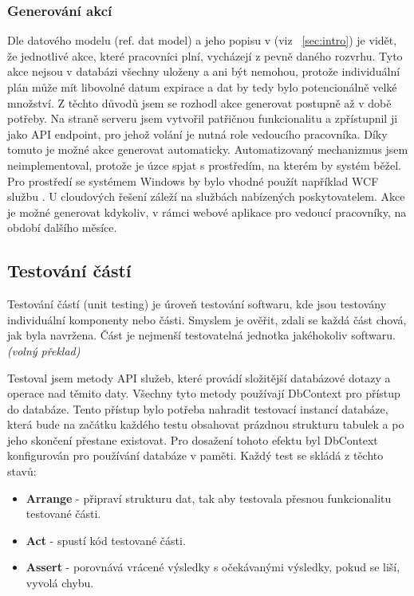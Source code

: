 \documentclass[
  glossaries,
]{kidiplom}
\begin{document}
\subsubsection{Generování akcí}
\label{sec:actionGenerating}
Dle datového modelu (ref. dat model) a jeho popisu v (viz ~\ref{sec:intro}) je vidět, že jednotlivé akce, které pracovníci plní, vycházejí z pevně daného rozvrhu. Tyto akce nejsou v databázi všechny uloženy a ani být nemohou, protože individuální plán může mít libovolné datum expirace a dat by tedy bylo potencionálně velké množství. Z těchto důvodů jsem se rozhodl akce generovat postupně až v době potřeby. Na straně serveru jsem vytvořil patřičnou funkcionalitu a zpřístupnil ji jako API endpoint, pro jehož volání je nutná role vedoucího pracovníka. Díky tomuto je možné akce generovat automaticky. Automatizovaný mechanizmus jsem neimplementoval, protože je úzce spjat s prostředím, na kterém by systém běžel. Pro prostředí se systémem Windows by bylo vhodné použít například WCF službu \cite{13}. U cloudových řešení záleží na službách nabízených poskytovatelem. Akce je možné generovat kdykoliv, v rámci webové aplikace pro vedoucí pracovníky, na období dalšího měsíce.

\subsection{Testování částí}
Testování částí (unit testing) je úroveň testování softwaru, kde jsou testovány individuální komponenty nebo části. Smyslem je ověřit, zdali se každá část chová, jak byla navržena. Část je nejmenší testovatelná jednotka jakéhokoliv softwaru. \cite{14} \textit{(volný překlad)}

Testoval jsem metody API služeb, které provádí složitější databázové dotazy a operace nad těmito daty. Všechny tyto metody používají DbContext pro přístup do databáze. Tento přístup bylo potřeba nahradit testovací instancí databáze, která bude na začátku každého testu obsahovat prázdnou strukturu tabulek a po jeho skončení přestane existovat. Pro dosažení tohoto efektu byl DbContext konfigurován pro používání databáze v paměti. Každý test se skládá z těchto stavů: 
\begin{itemize}
	\item \textbf{Arrange} - připraví strukturu dat, tak aby testovala přesnou funkcionalitu testované části.
	\item \textbf{Act} - spustí kód testované části.
	\item \textbf{Assert} - porovnává vrácené výsledky s očekávanými výsledky, pokud se liší, vyvolá chybu.
\end{itemize}
\end{document}
